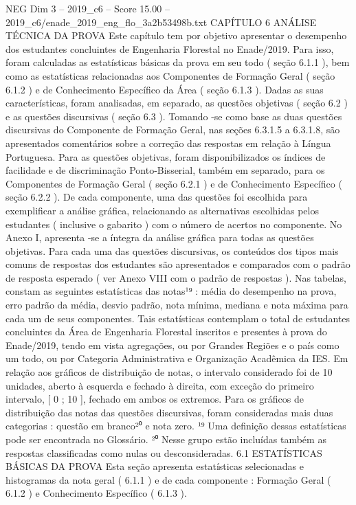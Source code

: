 \begin{textsample}{NEG Dim 3 – 2019\_c6 – Score 15.00 – 2019\_c6/enade\_2019\_eng\_flo\_3a2b53498b.txt}  \label{ex:f3_neg_265}
CAPÍTULO 6 ANÁLISE TÉCNICA DA PROVA Este capítulo tem por objetivo apresentar o desempenho dos estudantes concluintes de Engenharia Florestal no Enade/2019.
Para isso, foram calculadas as estatísticas básicas da prova em seu todo ( seção 6.1.1 ), bem como as estatísticas relacionadas aos Componentes de Formação Geral ( seção 6.1.2 ) e de Conhecimento Específico da Área ( seção 6.1.3 ).
Dadas as suas características, foram analisadas, em separado, as questões objetivas ( seção 6.2 ) e as questões discursivas ( seção 6.3 ).
Tomando -se como base as duas questões discursivas do Componente de Formação Geral, nas seções 6.3.1.5 a 6.3.1.8, são apresentados comentários sobre a correção das respostas em relação à Língua Portuguesa.
Para as questões objetivas, foram disponibilizados os índices de facilidade e de discriminação Ponto-Bisserial, também em separado, para os Componentes de Formação Geral ( seção 6.2.1 ) e de Conhecimento Específico ( seção 6.2.2 ).
De cada componente, uma das questões foi escolhida para exemplificar a análise gráfica, relacionando as alternativas escolhidas pelos estudantes ( inclusive o gabarito ) com o número de acertos no componente.
No Anexo I, apresenta -se a íntegra da análise gráfica para todas as questões objetivas.
Para cada uma das questões discursivas, os conteúdos dos tipos mais comuns de respostas dos estudantes são apresentados e comparados com o padrão de resposta esperado ( ver Anexo VIII com o padrão de respostas ).
Nas tabelas, constam as seguintes estatísticas das notas¹⁹ : média do desempenho na prova, erro padrão da média, desvio padrão, nota mínima, mediana e nota máxima para cada um de seus componentes.
Tais estatísticas contemplam o total de estudantes concluintes da Área de Engenharia Florestal inscritos e presentes à prova do Enade/2019, tendo em vista agregações, ou por Grandes Regiões e o país como um todo, ou por Categoria Administrativa e Organização Acadêmica da IES.
Em relação aos gráficos de distribuição de notas, o intervalo considerado foi de 10 unidades, aberto à esquerda e fechado à direita, com exceção do primeiro intervalo, [ 0 ; 10 ], fechado em ambos os extremos.
Para os gráficos de distribuição das notas das questões discursivas, foram consideradas mais duas categorias : questão em branco²⁰ e nota zero. ¹⁹ Uma definição dessas estatísticas pode ser encontrada no Glossário. ²⁰ Nesse grupo estão incluídas também as respostas classificadas como nulas ou desconsideradas. 6.1 ESTATÍSTICAS BÁSICAS DA PROVA Esta seção apresenta estatísticas selecionadas e histogramas da nota geral ( 6.1.1 ) e de cada componente : Formação Geral ( 6.1.2 ) e Conhecimento Específico ( 6.1.3 ).

\end{textsample}
